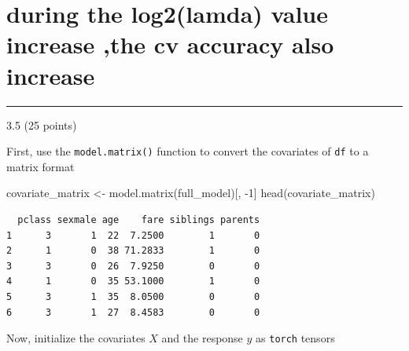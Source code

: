 \documentclass[
  letterpaper,
  DIV=11,
  numbers=noendperiod]{scrartcl}
\newenvironment{Shaded}{\begin{snugshade}}{\end{snugshade}}
\newcommand{\AttributeTok}[1]{\textcolor[rgb]{0.40,0.45,0.13}{#1}}
\newcommand{\CommentTok}[1]{\textcolor[rgb]{0.37,0.37,0.37}{#1}}
\newcommand{\DecValTok}[1]{\textcolor[rgb]{0.68,0.00,0.00}{#1}}
\newcommand{\FunctionTok}[1]{\textcolor[rgb]{0.28,0.35,0.67}{#1}}
\newcommand{\NormalTok}[1]{\textcolor[rgb]{0.00,0.23,0.31}{#1}}
\newcommand{\OtherTok}[1]{\textcolor[rgb]{0.00,0.23,0.31}{#1}}
\newcommand{\SpecialCharTok}[1]{\textcolor[rgb]{0.37,0.37,0.37}{#1}}
\begin{document}
\hypertarget{during-the-log2lamda-value-increase-the-cv-accuracy-also-increase}{%
\section{during the log2(lamda) value increase ,the cv accuracy also
increase}\label{during-the-log2lamda-value-increase-the-cv-accuracy-also-increase}}

\begin{center}\rule{0.5\linewidth}{0.5pt}\end{center}

3.5 (25 points)

First, use the \texttt{model.matrix()} function to convert the
covariates of \texttt{df} to a matrix format

\begin{Shaded}
\begin{Highlighting}[]
\NormalTok{covariate\_matrix }\OtherTok{\textless{}{-}} \FunctionTok{model.matrix}\NormalTok{(full\_model)[, }\SpecialCharTok{{-}}\DecValTok{1}\NormalTok{]}
\FunctionTok{head}\NormalTok{(covariate\_matrix)}
\end{Highlighting}
\end{Shaded}

\begin{verbatim}
  pclass sexmale age    fare siblings parents
1      3       1  22  7.2500        1       0
2      1       0  38 71.2833        1       0
3      3       0  26  7.9250        0       0
4      1       0  35 53.1000        1       0
5      3       1  35  8.0500        0       0
6      3       1  27  8.4583        0       0
\end{verbatim}

Now, initialize the covariates \(X\) and the response \(y\) as
\texttt{torch} tensors

\begin{Shaded}
\end{Shaded}
\end{document}
